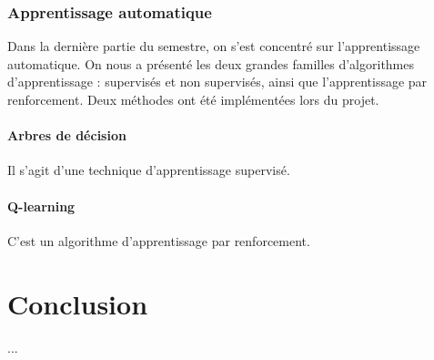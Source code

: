 \documentclass[12pt,a4paper]{article}
\begin{document}
\section{Apprentissage automatique}
Dans la derni\`ere partie du semestre, on s'est concentr\'e sur l'apprentissage 
automatique. On nous a pr\'esent\'e les deux grandes familles 
d'algorithmes d'apprentissage : supervis\'es et non supervis\'es, ainsi que 
l'apprentissage par renforcement. Deux m\'ethodes ont \'et\'e impl\'ement\'ees 
lors du projet.

\subsection*{Arbres de d\'ecision}
Il s'agit d'une technique d'apprentissage supervis\'e.

\subsection*{Q-learning}
C'est un algorithme d'apprentissage par renforcement.

\newpage

\part*{Conclusion}
...
\end{document}
